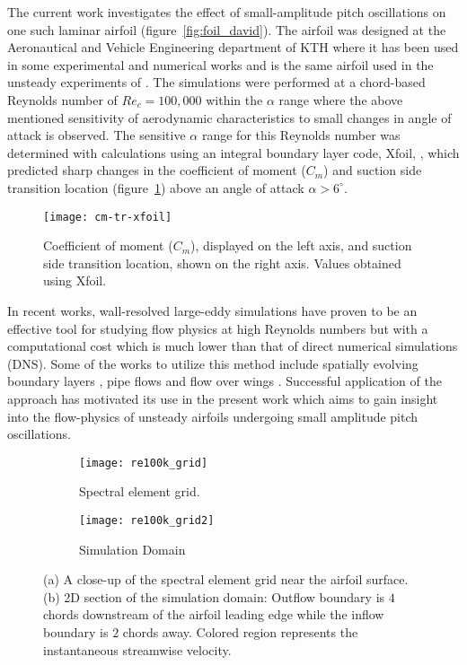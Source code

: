 The current work investigates the effect of small-amplitude pitch oscillations on one such laminar airfoil (figure~\ref{fig:foil_david}). The airfoil was designed at the Aeronautical and Vehicle Engineering department of KTH where it has been used in some experimental and numerical works \citep{lokatt17} and is the same airfoil used in the unsteady experiments of \cite{lokattthesis}. The simulations were performed at a chord-based Reynolds number of $Re_{c}=100,000$ within the $\alpha$ range where the above mentioned sensitivity of aerodynamic characteristics to small changes in angle of attack is observed. The sensitive $\alpha$ range for this Reynolds number was determined with calculations using an integral boundary layer code, Xfoil, \cite{drela89}, which predicted sharp changes in the coefficient of moment ($C_{m}$) and suction side transition location (figure~\ref{fig:xfoil_cm}) above an angle of attack $\alpha>6^{\circ}$.
\begin{figure}[h]
	\centering
	\texttt{[image: cm-tr-xfoil]}
	\caption{Coefficient of moment ($C_{m}$), displayed on the left axis, and suction side transition location, shown on the right axis. Values obtained using Xfoil.}
	\label{fig:xfoil_cm}
\end{figure}

In recent works, wall-resolved large-eddy simulations have proven to be an effective tool for studying flow physics at high Reynolds numbers but with a computational cost which is much lower than that of direct numerical simulations (DNS). Some of the works to utilize this method include spatially evolving boundary layers \citep{eitel14}, pipe flows \citep{chin15} and flow over wings \citep{uzun10,lombard15}. Successful application of the approach has motivated its use in the present work which aims to gain insight into the flow-physics of unsteady airfoils undergoing small amplitude pitch oscillations.
\begin{figure}
	\begin{subfigure}[t]{0.48\textwidth}
		\centering
		\texttt{[image: re100k\_grid]}
		\caption{Spectral element grid.}
		\label{fig:re100k_grid}
	\end{subfigure}
	\begin{subfigure}[t]{0.48\textwidth}
		\centering
		\texttt{[image: re100k\_grid2]}
		\caption{Simulation Domain}
		\label{fig:re100k_domain}
	\end{subfigure}
	\caption{(a) A close-up of the spectral element grid near the airfoil surface. (b) 2D section of the simulation domain: Outflow boundary is $4$ chords downstream of the airfoil leading edge while the inflow boundary is $2$ chords away. Colored region represents the instantaneous streamwise velocity. }	
\end{figure}

